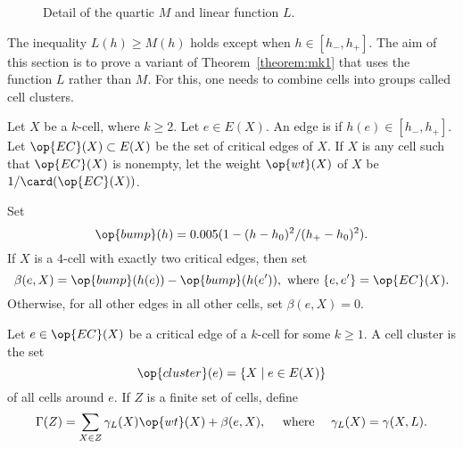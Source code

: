 \begin{figure}[htb]
\centering
{}
\caption{Detail of the quartic $M$ and linear function $L$.}
\label{fig:L}
\end{figure}

The inequality $L(h)\ge M(h)$ holds except when $h\in [h_-,h_+]$.  The
aim of this section is to prove a variant of Theorem~\ref{theorem:mk1}
that uses the function $L$ rather than $M$.  For this, one needs to
combine cells into groups called cell clusters.

\begin{definition}\label{def:wt}
Let $X$ be a $k$-cell, where $k\ge 2$.  Let $e\in E(X)$.  An edge is
 if $h(e)\in[h_-,h_+]$.  Let $\op{EC}(X)\subset
E(X)$ be the set of critical edges of $X$.  If $X$ is any cell such
that $\op{EC}(X)$ is nonempty, let the weight $\op{wt}(X)$ of $X$ be
$1/\card(\op{EC}(X))$.
\end{definition}
%
%
%

\begin{definition} \label{def:beta}
Set 
\begin{displaymath}
\op{bump}(h) = 0.005 (1 - (h-h_0)^2/(h_+-h_0)^2).
\end{displaymath}
If $X$ is a $4$-cell with exactly two critical edges, then set
\begin{displaymath}
\beta(e,X) = \op{bump}(h(e)) - \op{bump}(h(e')), \text{ where } \{e,e'\} = \op{EC}(X).  
\end{displaymath}
Otherwise, for all other edges in all other cells, set $\beta(e,X) = 0$.
\end{definition}
%
%

\begin{definition}\label{def:gammaL}
Let $e\in \op{EC}(X)$ be a critical edge of a $k$-cell for some $k\ge 1$.
A cell cluster is the set 
\begin{displaymath}
\op{cluster}(e) = \{X\mid e\in E(X)\} 
\end{displaymath}
%
of all cells around $e$. 
If $Z$ is a finite set of cells, define
%
\begin{displaymath}
\Gamma(Z) = \sum_{X\in Z} \gamma_L(X) \op{wt}(X) +\beta(e,X),\quad\hbox{ where }\quad
\gamma_L(X) = \gamma(X,L).
\end{displaymath}
%
%

\end{definition}
%

